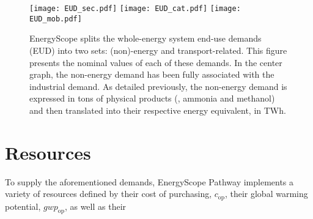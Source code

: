 \begin{figure}[htbp!]
\centering
\texttt{[image: EUD\_sec.pdf]}
\texttt{[image: EUD\_cat.pdf]}
\texttt{[image: EUD\_mob.pdf]}
\caption{EnergyScope splits the whole-energy system end-use demands (EUD) into two sets: (non)-energy and transport-related. This figure presents the nominal values of each of these demands. In the center graph, the non-energy demand has been fully associated with the industrial demand. As detailed previously, the non-energy demand is expressed in tons of physical products (\ie {}, ammonia and methanol) and then translated into their respective energy equivalent, in TWh.}
\label{fig:cs_demands}
\end{figure}


\section{Resources}
\label{sec:cs:resources}
To supply the aforementioned demands, EnergyScope Pathway implements a variety of resources defined by their cost of purchasing, $\mathit{c}_{\mathrm{op}}$, their global warming potential, $\mathit{gwp}_{\mathrm{op}}$, as well as their 
